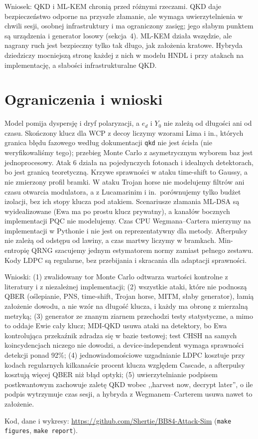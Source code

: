 \documentclass[11pt,a4paper]{article}
\begin{document}
Wniosek: QKD i ML-KEM chronią przed różnymi rzeczami. QKD daje bezpieczeństwo odporne na przyszłe złamanie, ale wymaga uwierzytelnienia w chwili sesji, osobnej infrastruktury i ma ograniczony zasięg; jego słabym punktem są urządzenia i generator losowy (sekcja~4). ML-KEM działa wszędzie, ale nagrany ruch jest bezpieczny tylko tak długo, jak założenia kratowe. Hybryda dziedziczy mocniejszą stronę każdej z nich w modelu HNDL i przy atakach na implementację, a słabości infrastrukturalne QKD.

\section{Ograniczenia i wnioski}

Model pomija dyspersję i dryf polaryzacji, a $e_d$ i $Y_0$ nie zależą od długości ani od czasu. Skończony klucz dla WCP z decoy liczymy wzorami Lima i in., których granica błędu fazowego według dokumentacji \texttt{qkd} nie jest ścisła (nie weryfikowaliśmy tego); przebieg Monte Carlo z asymetrycznym wyborem baz jest jednoprocesowy. Atak 6 działa na pojedynczych fotonach i idealnych detektorach, bo jest granicą teoretyczną. Krzywe sprawności w ataku time-shift to Gaussy, a nie zmierzony profil bramki. W ataku Trojan horse nie modelujemy filtrów ani czasu otwarcia modulatora, a z Lucamarinim i in.\ porównujemy tylko budżet izolacji, bez ich stopy klucza pod atakiem. Scenariusze złamania ML-DSA są wyidealizowane (Ewa ma po prostu klucz prywatny), a kanałów bocznych implementacji PQC nie modelujemy. Czas CPU Wegmana--Cartera mierzymy na implementacji w Pythonie i nie jest on reprezentatywny dla metody. Afterpulsy nie zależą od odstępu od lawiny, a czas martwy liczymy w bramkach. Min-entropię QRNG szacujemy jednym estymatorem normy zamiast pełnego zestawu. Kody LDPC są regularne, bez przebijania i skracania dla adaptacji sprawności.

Wnioski: (1) zwalidowany tor Monte Carlo odtwarza wartości kontrolne z literatury i z niezależnej implementacji; (2) wszystkie ataki, które nie podnoszą QBER (oślepianie, PNS, time-shift, Trojan horse, MITM, słaby generator), łamią założenie dowodu, a nie wzór na długość klucza, i każdy ma obronę z mierzalną metryką; (3) generator ze znanym ziarnem przechodzi testy statystyczne, a mimo to oddaje Ewie cały klucz; MDI-QKD usuwa ataki na detektory, bo Ewa kontrolująca przekaźnik zdradza się w bazie testowej; test CHSH na samych koincydencjach niczego nie dowodzi, a device-independent wymaga sprawności detekcji ponad 92\%; (4) jednowiadomościowe uzgadnianie LDPC kosztuje przy kodach regularnych kilkanaście procent klucza względem Cascade, a afterpulsy kosztują więcej QBER niż błąd optyki; (5) uwierzytelnianie podpisem postkwantowym zachowuje zaletę QKD wobec ,,harvest now, decrypt later'', o ile podpis wytrzymuje czas sesji, a hybryda z Wegmanem--Carterem usuwa nawet to założenie.

Kod, dane i wykresy: \url{https://github.com/Shertie/BB84-Attack-Sim} (\texttt{make figures}, \texttt{make report}).



\end{document}
